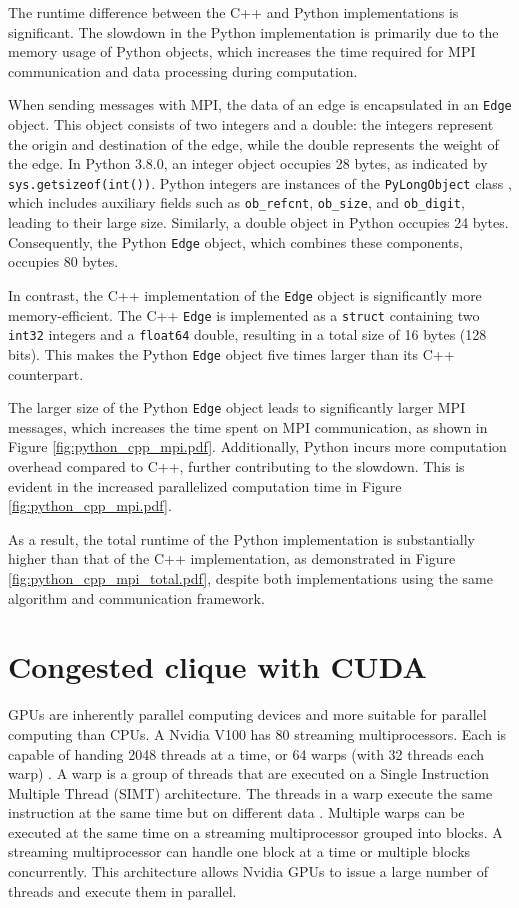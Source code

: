 \documentclass[english, 12pt, a4paper, elec, utf8, a-2b, online]{aaltothesis}
\begin{document}
The runtime difference between the C++ and Python implementations is significant. The slowdown in the Python implementation is primarily due to the memory usage of Python objects, which increases the time required for MPI communication and data processing during computation.

When sending messages with MPI, the data of an edge is encapsulated in an \texttt{Edge} object. This object consists of two integers and a double: the integers represent the origin and destination of the edge, while the double represents the weight of the edge. In Python 3.8.0, an integer object occupies 28 bytes, as indicated by \texttt{sys.getsizeof(int())}. Python integers are instances of the \texttt{PyLongObject} class \cite{PythonInt}, which includes auxiliary fields such as \texttt{ob\_refcnt}, \texttt{ob\_size}, and \texttt{ob\_digit}, leading to their large size. Similarly, a double object in Python occupies 24 bytes. Consequently, the Python \texttt{Edge} object, which combines these components, occupies 80 bytes.

In contrast, the C++ implementation of the \texttt{Edge} object is significantly more memory-efficient. The C++ \texttt{Edge} is implemented as a \texttt{struct} containing two \texttt{int32} integers and a \texttt{float64} double, resulting in a total size of 16 bytes (128 bits). This makes the Python \texttt{Edge} object five times larger than its C++ counterpart.

The larger size of the Python \texttt{Edge} object leads to significantly larger MPI messages, which increases the time spent on MPI communication, as shown in Figure \cref{fig:python_cpp_mpi.pdf}. Additionally, Python incurs more computation overhead compared to C++, further contributing to the slowdown. This is evident in the increased parallelized computation time in Figure \cref{fig:python_cpp_mpi.pdf}.

As a result, the total runtime of the Python implementation is substantially higher than that of the C++ implementation, as demonstrated in Figure \cref{fig:python_cpp_mpi_total.pdf}, despite both implementations using the same algorithm and communication framework.
\clearpage

\section{Congested clique with CUDA}
\label{sec:cuda}
GPUs are inherently parallel computing devices and more suitable for parallel computing than CPUs. A Nvidia V100 \cite{PuhtiDoc} has 80 streaming multiprocessors. Each is capable of handing 2048 threads at a time, or 64 warps (with 32 threads each warp) \cite{V100Architecture}. A warp is a group of threads that are executed on a Single Instruction Multiple Thread (SIMT) architecture. The threads in a warp execute the same instruction at the same time but on different data \cite{Simtarch}. Multiple warps can be executed at the same time on a streaming multiprocessor grouped into blocks. A streaming multiprocessor can handle one block at a time or multiple blocks concurrently. This architecture allows Nvidia GPUs to issue a large number of threads and execute them in parallel.
\end{document}
